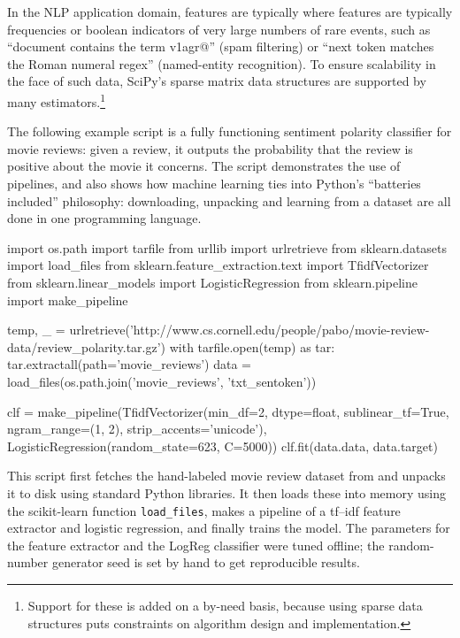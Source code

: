 \documentclass[a4paper]{article}
\begin{document}
In the NLP application domain,
features are typically 
where features are typically frequencies or boolean indicators
of very large numbers of rare events, such as
``document contains the term \textsf{v1agr@}'' (spam filtering)
or ``next token matches the Roman numeral regex'' (named-entity recognition).
To ensure scalability in the face of such data,
SciPy's sparse matrix data structures are supported by many estimators.\footnote{
  Support for these is added on a by-need basis,
  because using sparse data structures puts constraints on algorithm design
  and implementation.
}

The following example script is a fully functioning
sentiment polarity classifier for movie reviews:
given a review, it outputs the probability that the review is positive
about the movie it concerns.
The script demonstrates the use of pipelines,
and also shows how machine learning ties into Python's
``batteries included'' philosophy:
downloading, unpacking and learning from a dataset
are all done in one programming language.

\begin{pythoncode}
import os.path
import tarfile
from urllib import urlretrieve
from sklearn.datasets import load\_files
from sklearn.feature\_extraction.text import TfidfVectorizer
from sklearn.linear\_models import LogisticRegression
from sklearn.pipeline import make\_pipeline

temp, \_ = urlretrieve('http://www.cs.cornell.edu/people/pabo/movie-review-data/review\_polarity.tar.gz')
with tarfile.open(temp) as tar:
    tar.extractall(path='movie\_reviews')
data = load\_files(os.path.join('movie\_reviews', 'txt\_sentoken'))

clf = make\_pipeline(TfidfVectorizer(min\_df=2, dtype=float,
                                    sublinear\_tf=True, ngram\_range=(1, 2),
                                    strip\_accents='unicode'),
                     LogisticRegression(random\_state=623, C=5000))
clf.fit(data.data, data.target)
\end{pythoncode}

This script first fetches the hand-labeled movie review dataset from
\cite{pang2004} and unpacks it to disk using standard Python libraries.
It then loads these into memory using the scikit-learn function
\texttt{load\_files}, makes a pipeline of a \textsf{tf--idf} feature extractor
\cite{rennie2003tackling} and logistic regression,
and finally trains the model.
The parameters for the feature extractor and the LogReg classifier
were tuned offline; the random-number generator seed is set by hand
to get reproducible results.
\end{document}
